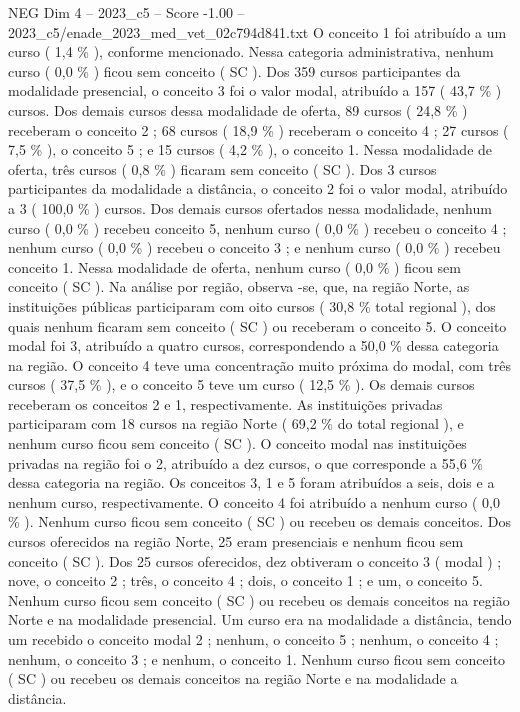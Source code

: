 \begin{textsample}{NEG Dim 4 – 2023\_c5 – Score -1.00 – 2023\_c5/enade\_2023\_med\_vet\_02c794d841.txt}
O conceito 1 foi atribuído a um curso ( 1,4 \% ), conforme mencionado.
Nessa categoria administrativa, nenhum curso ( 0,0 \% ) ficou sem conceito ( SC ).
Dos 359 cursos participantes da modalidade presencial, o conceito 3 foi o valor modal, atribuído a 157 ( 43,7 \% ) cursos.
Dos demais cursos dessa modalidade de oferta, 89 cursos ( 24,8 \% ) receberam o conceito 2 ; 68 cursos ( 18,9 \% ) receberam o conceito 4 ; 27 cursos ( 7,5 \% ), o conceito 5 ; e 15 cursos ( 4,2 \% ), o conceito 1.
Nessa modalidade de oferta, três cursos ( 0,8 \% ) ficaram sem conceito ( SC ).
Dos 3 cursos participantes da modalidade a distância, o conceito 2 foi o valor modal, atribuído a 3 ( 100,0 \% ) cursos.
Dos demais cursos ofertados nessa modalidade, nenhum curso ( 0,0 \% ) recebeu conceito 5, nenhum curso ( 0,0 \% ) recebeu o conceito 4 ; nenhum curso ( 0,0 \% ) recebeu o conceito 3 ; e nenhum curso ( 0,0 \% ) recebeu conceito 1.
Nessa modalidade de oferta, nenhum curso ( 0,0 \% ) ficou sem conceito ( SC ).
Na análise por região, observa -se, que, na região Norte, as instituições públicas participaram com oito cursos ( 30,8 \% total regional ), dos quais nenhum ficaram sem conceito ( SC ) ou receberam o conceito 5.
O conceito modal foi 3, atribuído a quatro cursos, correspondendo a 50,0 \% dessa categoria na região.
O conceito 4 teve uma concentração muito próxima do modal, com três cursos ( 37,5 \% ), e o conceito 5 teve um curso ( 12,5 \% ).
Os demais cursos receberam os conceitos 2 e 1, respectivamente.
As instituições privadas participaram com 18 cursos na região Norte ( 69,2 \% do total regional ), e nenhum curso ficou sem conceito ( SC ).
O conceito modal nas instituições privadas na região foi o 2, atribuído a dez cursos, o que corresponde a 55,6 \% dessa categoria na região.
Os conceitos 3, 1 e 5 foram atribuídos a seis, dois e a nenhum curso, respectivamente.
O conceito 4 foi atribuído a nenhum curso ( 0,0 \% ).
Nenhum curso ficou sem conceito ( SC ) ou recebeu os demais conceitos.
Dos cursos oferecidos na região Norte, 25 eram presenciais e nenhum ficou sem conceito ( SC ).
Dos 25 cursos oferecidos, dez obtiveram o conceito 3 ( modal ) ; nove, o conceito 2 ; três, o conceito 4 ; dois, o conceito 1 ; e um, o conceito 5.
Nenhum curso ficou sem conceito ( SC ) ou recebeu os demais conceitos na região Norte e na modalidade presencial.
Um curso era na modalidade a distância, tendo um recebido o conceito modal 2 ; nenhum, o conceito 5 ; nenhum, o conceito 4 ; nenhum, o conceito 3 ; e nenhum, o conceito 1.
Nenhum curso ficou sem conceito ( SC ) ou recebeu os demais conceitos na região Norte e na modalidade a distância.

\end{textsample}
